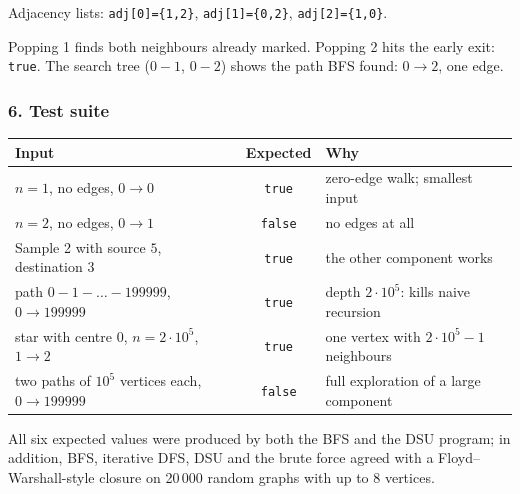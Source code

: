 \begin{tracebox}[{Sample 1: $n = 3$, source $0$, destination $2$}]
Adjacency lists: \texttt{adj[0]=\{1,2\}}, \texttt{adj[1]=\{0,2\}}, \texttt{adj[2]=\{1,0\}}.
\begin{center}
\end{center}
Popping 1 finds both neighbours already marked. Popping 2 hits the early exit: \texttt{true}. The search tree ($0{-}1$, $0{-}2$) shows the path BFS found: $0 \to 2$, one edge.
\end{tracebox}

\subsubsection*{6. Test suite}

\begin{testbox}
\centering\small
\begin{tabular}{@{}p{6.6cm}cp{5.0cm}@{}}
\toprule
\textbf{Input} & \textbf{Expected} & \textbf{Why} \\
\midrule
$n=1$, no edges, $0 \to 0$ & \texttt{true} & zero-edge walk; smallest input \\
$n=2$, no edges, $0 \to 1$ & \texttt{false} & no edges at all \\
Sample 2 with source $5$, destination $3$ & \texttt{true} & the other component works \\
path $0-1-\dots-199999$, $0 \to 199999$ & \texttt{true} & depth $2\cdot10^5$: kills naive recursion \\
star with centre 0, $n = 2\cdot10^5$, $1 \to 2$ & \texttt{true} & one vertex with $2\cdot10^5-1$ neighbours \\
two paths of $10^5$ vertices each, $0 \to 199999$ & \texttt{false} & full exploration of a large component \\
\bottomrule
\end{tabular}
\end{testbox}
All six expected values were produced by both the BFS and the DSU program; in addition, BFS, iterative DFS, DSU and the brute force agreed with a Floyd--Warshall-style closure on 20\,000 random graphs with up to 8 vertices.

